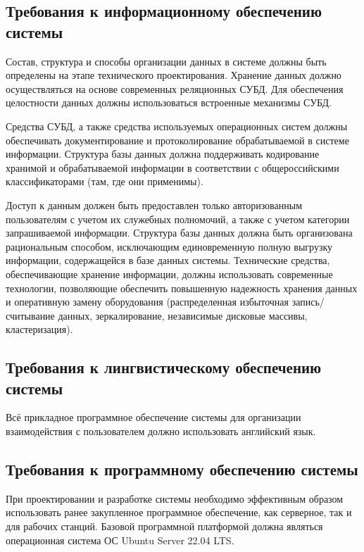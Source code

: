 \subsection{Требования к информационному обеспечению системы}

Состав, структура и способы организации данных в системе должны быть определены на этапе технического проектирования. Хранение данных должно осуществляться на основе современных реляционных СУБД. Для обеспечения целостности данных должны использоваться встроенные механизмы СУБД. 

Средства СУБД, а также средства используемых операционных систем должны обеспечивать документирование и протоколирование обрабатываемой в системе информации. Структура базы данных должна поддерживать кодирование хранимой и обрабатываемой информации в соответствии с общероссийскими классификаторами (там, где они применимы). 

Доступ к данным должен быть предоставлен только авторизованным пользователям с учетом их служебных полномочий, а также с учетом категории запрашиваемой информации. Структура базы данных должна быть организована рациональным способом, исключающим единовременную полную выгрузку информации, содержащейся в базе данных системы. Технические средства, обеспечивающие хранение информации, должны использовать современные технологии, позволяющие обеспечить повышенную надежность хранения данных и оперативную замену оборудования (распределенная избыточная запись/считывание данных, зеркалирование, независимые дисковые массивы, кластеризация). 

\subsection{Требования к лингвистическому обеспечению системы}

Всё прикладное программное обеспечение системы для организации взаимодействия с пользователем должно использовать английский язык.

\subsection{Требования к программному обеспечению системы}

При проектировании и разработке системы необходимо эффективным образом использовать ранее закупленное программное обеспечение, как серверное, так и для рабочих станций. Базовой программной платформой должна являться операционная система ОС Ubuntu Server 22.04 LTS. 


